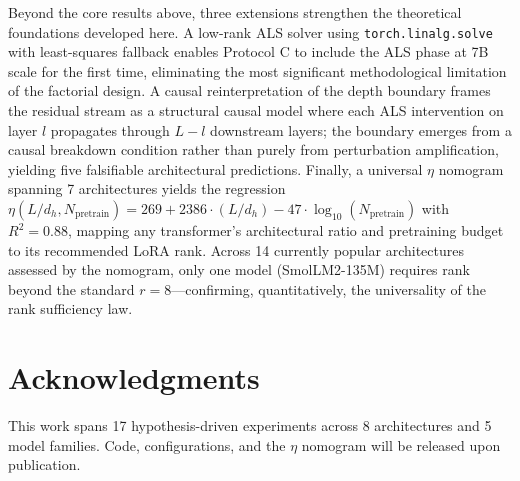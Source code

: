 \documentclass[11pt]{article}
\begin{document}
Beyond the core results above, three extensions strengthen the theoretical foundations developed here. A low-rank ALS solver using \texttt{torch.linalg.solve} with least-squares fallback enables Protocol C to include the ALS phase at 7B scale for the first time, eliminating the most significant methodological limitation of the factorial design. A causal reinterpretation of the depth boundary frames the residual stream as a structural causal model where each ALS intervention on layer $l$ propagates through $L-l$ downstream layers; the boundary emerges from a causal breakdown condition rather than purely from perturbation amplification, yielding five falsifiable architectural predictions. Finally, a universal $\eta$ nomogram spanning 7 architectures yields the regression $\eta(L/d_h, N_{\text{pretrain}}) = 269 + 2386\cdot(L/d_h) - 47\cdot\log_{10}(N_{\text{pretrain}})$ with $R^2 = 0.88$, mapping any transformer's architectural ratio and pretraining budget to its recommended LoRA rank. Across 14 currently popular architectures assessed by the nomogram, only one model (SmolLM2-135M) requires rank beyond the standard $r=8$---confirming, quantitatively, the universality of the rank sufficiency law.

\section*{Acknowledgments}

This work spans 17 hypothesis-driven experiments across 8 architectures and 5 model families. Code, configurations, and the $\eta$ nomogram will be released upon publication.
\end{document}
